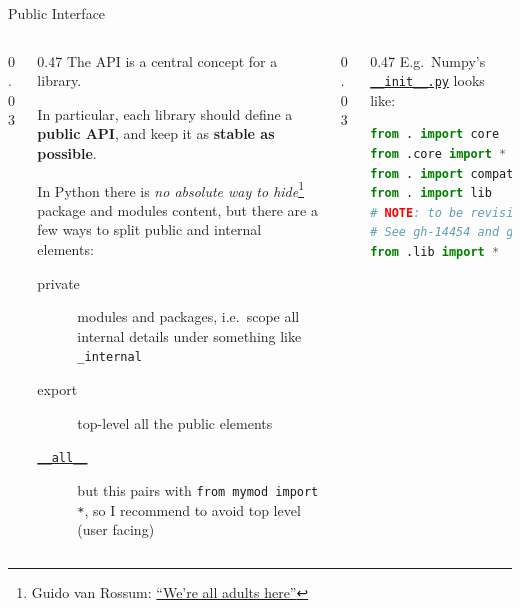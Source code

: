 \documentclass[9pt]{beamer}
\begin{document}
\begin{frame}[fragile]{Public Interface}
    \vspace*{20pt}
    \begin{columns}
        \begin{column}{0.03\textwidth}
        \end{column}
        \begin{column}{0.47\textwidth}
            The API is a central concept for a library.

            In particular, each library should define a \alert{\textbf{public
            API}}, and keep it as \textbf{stable as possible}.
            \vspace*{20pt}

            In Python there is \textit{no absolute way to hide}\footnote{
                Guido van Rossum:
                \href{https://therealadam.com/2016/09/26/were-all-adults-here-but-were-not-all-mind-readers/}{\enquote{We're all adults here}}
            } package and
            modules content, but there are a few ways to split public and
            internal elements:

            \begin{description}
                \item[private] modules and packages, i.e.\ scope all internal
                  details under something like \texttt{\_internal}
                \item[export] top-level all the public elements
                \item[\href{https://docs.python.org/3/tutorial/modules.html\#importing-from-a-package}{\texttt{\_\_all\_\_}}]
                    but this pairs with \texttt{from mymod import *}, so I
                    recommend to avoid top level (user facing)
            \end{description}
            \vspace*{20pt}
        \end{column}
        \begin{column}{0.03\textwidth}
        \end{column}
        \begin{column}{0.47\textwidth}
            E.g.\ Numpy's
            \href{https://github.com/numpy/numpy/blob/86cd584b81385508f7d939fc66393a6a27f02659/numpy/__init__.py#L140-L155}{\texttt{\_\_init\_\_.py}}
            looks like:

            \begin{lstlisting}[language=Python,style=mystyle,firstnumber=140]
from . import core
from .core import *
from . import compat
from . import lib
# NOTE: to be revisited following future namespace cleanup.
# See gh-14454 and gh-15672 for discussion.
from .lib import *



\end{lstlisting}
\end{column}
\end{columns}
\end{frame}
\end{document}
